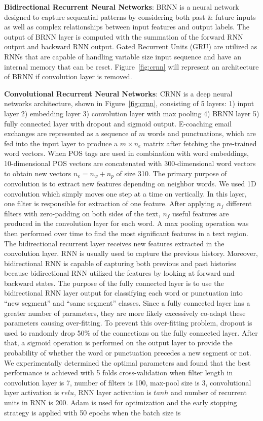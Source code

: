 \documentclass{amia}
\begin{document}
\textbf{Bidirectional Recurrent Neural Networks}: BRNN is a neural network designed to capture sequential patterns by considering both past \& future inputs as well as complex relationships between input features and output labels.\cite{schuster1997bidirectional} The output of BRNN layer is computed with the summation of the forward RNN output and backward RNN output. Gated Recurrent Units (GRU)\cite{chung2014empirical} are utilized as RNNs that are capable of handling variable size input sequence and have an internal memory that can be reset. Figure~\ref{fig:crnn} will represent an architecture of BRNN if convolution layer is removed.  

\textbf{Convolutional Recurrent Neural Networks}: CRNN is a deep neural networks architecture,\cite{treviso2017sentence} shown in Figure~\ref{fig:crnn}, consisting of 5 layers: 1) input layer 2) embedding layer 3) convolution layer with max pooling 4) BRNN layer 5) fully connected layer with dropout and sigmoid output. E-coaching email exchanges are represented as a sequence of $m$ words and punctuations, which are fed into the input layer to produce a $m \times n_e$ matrix after fetching the pre-trained word vectors. When POS tags are used in combination with word embeddings, 10-dimensional POS vectors are concatenated with 300-dimensional word vectors to obtain new vectors $n_e = n_w + n_p$ of size 310. The primary purpose of convolution is to extract new features depending on neighbor words. We used 1D convolution which simply moves one step at a time on vertically. In this layer, one filter is responsible for extraction of one feature. After applying $n_f$ different filters with zero-padding on both sides of the text, $n_f$ useful features are produced in the convolution layer for each word. A max pooling operation was then performed over time to find the most significant features in a text region. The bidirectional recurrent layer receives new features extracted in the convolution layer. RNN is usually used to capture the previous history. Moreover, bidirectional RNN is capable of capturing both previous and past histories because bidirectional RNN utilized the features by looking at forward and backward states. The purpose of the fully connected layer is to use the bidirectional RNN layer output for classifying each word or punctuation into ``new segment'' and ``same segment'' classes. Since a fully connected layer has a greater number of parameters, they are more likely excessively co-adapt these parameters causing over-fitting. To prevent this over-fitting problem, dropout is used to randomly drop 50\% of the connections on the fully connected layer. After that, a sigmoid operation is performed on the output layer to provide the probability of whether the word or punctuation precedes a new segment or not. We experimentally determined the optimal parameters and found that the best performance is achieved with 5 folds cross-validation when filter length in convolution layer is 7, number of filters is 100, max-pool size is 3, convolutional layer activation is $relu$, RNN layer activation is $tanh$ and number of recurrent units in RNN is 200. Adam\cite{kingma2014adam} is used for optimization and the early stopping strategy is applied with 50 epochs when the batch size is 
\end{document}
